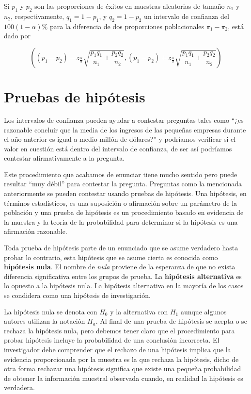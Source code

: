 \documentclass[
]{krantz}
\begin{document}
Si \(p_1\) y \(p_2\) son las proporciones de éxitos en muestras aleatorias de tamaño \(n_1\) y \(n_2\), respectivamente, \(q_1 = 1- p_1\), y \(q_2 = 1- p_2\) un intervalo de confianza del \(100\left(1- \alpha \right)\%\) para la diferencia de dos proporciones poblacionales \(\pi_1-\pi_2\), está dado por

\begin{equation} 
\left( \left( p_1 - p_2 \right) - z_{\frac{\alpha}{2}}\sqrt{\dfrac{p_1q_1}{n_1} + \dfrac{p_2q_2}{n_2}} , \left( p_1 - p_2 \right) + z_{\frac{\alpha}{2}}\sqrt{\dfrac{p_1q_1}{n_1} + \dfrac{p_2q_2}{n_2}}  \right)
\label{eq:icprop2}
\end{equation}

\hypertarget{ph}{%
\section{Pruebas de hipótesis}\label{ph}}

Los intervalos de confianza pueden ayudar a contestar preguntas tales como ``¿es razonable concluir que la media de los ingresos de las pequeñas empresas durante el año anterior es igual a medio millón de dólares?'' y podrìamos verificar si el valor en cuestión está dentro del intervalo de confianza, de ser así podríamos contestar afirmativamente a la pregunta.

Este procedimiento que acabamos de enunciar tiene mucho sentido pero puede resultar ``muy débil'' para contestar la pregunta. Preguntas como la mencionada anteriormente se pueden contestar usando pruebas de hipótesis. Una hipótesis, en términos estadísticos, es una suposición o afirmación sobre un parámetro de la población y una prueba de hipótesis es un procedimiento basado en evidencia de la muestra y la teoría de la probabilidad para determinar si la hipótesis es una afirmación razonable.

Toda prueba de hipótesis parte de un enunciado que se asume verdadero hasta probar lo contrario, esta hipótesis que se asume cierta es conocida como \textbf{hipótesis nula}. El nombre de \emph{nula} proviene de la esperanza de que no exista diferencia significativa entre los grupos de prueba. La \textbf{hipótesis alternativa} es lo opuesto a la hipótesis nula. La hipótesis alternativa en la mayoría de los casos se condidera como una hipótesis de investigación.

La hipótesis nula se denota con \(H_0\) y la alternativa con \(H_1\) aunque algunos autores utilizan la notación \(H_a\). Al final de una prueba de hipótesis se acepta o se rechaza la hipótesis nula, pero debemos tener claro que el procedimiento para probar hipótesis incluye la probabilidad de una conclusión incorrecta. El investigador debe comprender que el rechazo de una hipótesis implica que la evidencia proporcionada por la muestra es la que rechaza la hipótesis, dicho de otra forma rechazar una hipótesis significa que existe una pequeña probabilidad de obtener la información muestral observada cuando, en realidad la hipótesis es verdadera.
\end{document}
